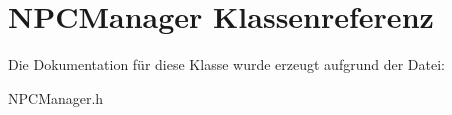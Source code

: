 \hypertarget{class_n_p_c_manager}{\section{N\-P\-C\-Manager Klassenreferenz}
\label{class_n_p_c_manager}
}


Die Dokumentation für diese Klasse wurde erzeugt aufgrund der Datei\-:\begin{DoxyCompactItemize}
\item 
N\-P\-C\-Manager.\-h\end{DoxyCompactItemize}

